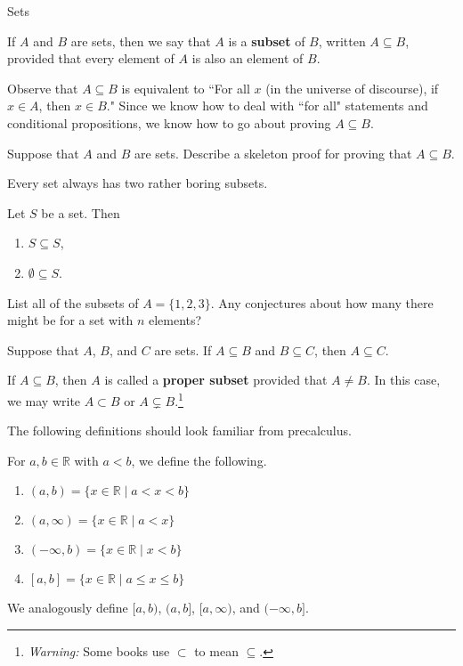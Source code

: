 \begin{section}{Sets}
\begin{definition}
If $A$ and $B$ are sets, then we say that $A$ is a \textbf{subset} of $B$, written $\boxed{A\subseteq B}$, provided that every element of $A$ is also an element of $B$.
\end{definition}

Observe that $A\subseteq B$ is equivalent to ``For all $x$ (in the universe of discourse), if $x\in A$, then $x\in B$."  Since we know how to deal with ``for all" statements and conditional propositions, we know how to go about proving $A\subseteq B$.

\begin{problem}
Suppose that $A$ and $B$ are sets.  Describe a skeleton proof for proving that $A\subseteq B$.
\end{problem}

Every set always has two rather boring subsets.

\begin{theorem}
Let $S$ be a set.  Then
\begin{enumerate}[label=\textrm{(\alph*)}]
\item $S\subseteq S$,
\item $\emptyset \subseteq S$.
\end{enumerate}
\end{theorem}

\begin{exercise}
List all of the subsets of $A=\{1,2,3\}$.  Any conjectures about how many there might be for a set with $n$ elements?
\end{exercise}

\begin{theorem}
Suppose that $A$, $B$, and $C$ are sets.  If $A\subseteq B$ and $B\subseteq C$, then $A\subseteq C$.
\end{theorem}

\begin{definition}
If $A\subseteq B$, then $A$ is called a \textbf{proper subset} provided that $A\neq B$.  In this case, we may write $\boxed{A\subset B}$ or $\boxed{A\subsetneq B}$.\footnote{\emph{Warning:} Some books use $\subset$ to mean $\subseteq$.}
\end{definition}

The following definitions should look familiar from precalculus.

\begin{definition}
For $a,b\in\mathbb{R}$ with $a<b$, we define the following.
\begin{enumerate}[label=\textrm{(\alph*)}]
\item $(a,b)=\{x\in\mathbb{R}\mid a<x<b\}$
\item $(a,\infty)=\{x\in\mathbb{R}\mid a<x\}$
\item $(-\infty,b)=\{x\in\mathbb{R}\mid x<b\}$
\item $[a,b]=\{x\in\mathbb{R}\mid a\leq x\leq b\}$
\end{enumerate}
We analogously define $[a,b)$, $(a,b]$, $[a,\infty)$, and $(-\infty,b]$.
\end{definition}


\end{section}
